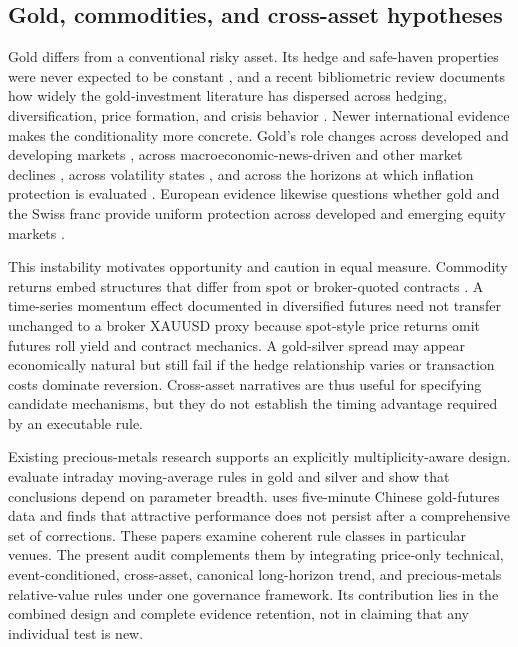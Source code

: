 \subsection{Gold, commodities, and cross-asset hypotheses}

Gold differs from a conventional risky asset. Its hedge and safe-haven properties were never expected to be constant \citep{baur2010hedge,baur2010safe}, and a recent bibliometric review documents how widely the gold-investment literature has dispersed across hedging, diversification, price formation, and crisis behavior \citep{pattnaik2023}. Newer international evidence makes the conditionality more concrete. Gold's role changes across developed and developing markets \citep{gurdgiev2024}, across macroeconomic-news-driven and other market declines \citep{ryan2024}, across volatility states \citep{faraj2025}, and across the horizons at which inflation protection is evaluated \citep{xu2026}. European evidence likewise questions whether gold and the Swiss franc provide uniform protection across developed and emerging equity markets \citep{papathanasiou2026}.

This instability motivates opportunity and caution in equal measure. Commodity returns embed structures that differ from spot or broker-quoted contracts \citep{erb2006}. A time-series momentum effect documented in diversified futures \citep{moskowitz2012,szakmary2010,hurst2017} need not transfer unchanged to a broker XAUUSD proxy because spot-style price returns omit futures roll yield and contract mechanics. A gold-silver spread may appear economically natural but still fail if the hedge relationship varies or transaction costs dominate reversion. Cross-asset narratives are thus useful for specifying candidate mechanisms, but they do not establish the timing advantage required by an executable rule.

Existing precious-metals research supports an explicitly multiplicity-aware design. \citet{batten2018} evaluate intraday moving-average rules in gold and silver and show that conclusions depend on parameter breadth. \citet{jin2022} uses five-minute Chinese gold-futures data and finds that attractive performance does not persist after a comprehensive set of corrections. These papers examine coherent rule classes in particular venues. The present audit complements them by integrating price-only technical, event-conditioned, cross-asset, canonical long-horizon trend, and precious-metals relative-value rules under one governance framework. Its contribution lies in the combined design and complete evidence retention, not in claiming that any individual test is new.

